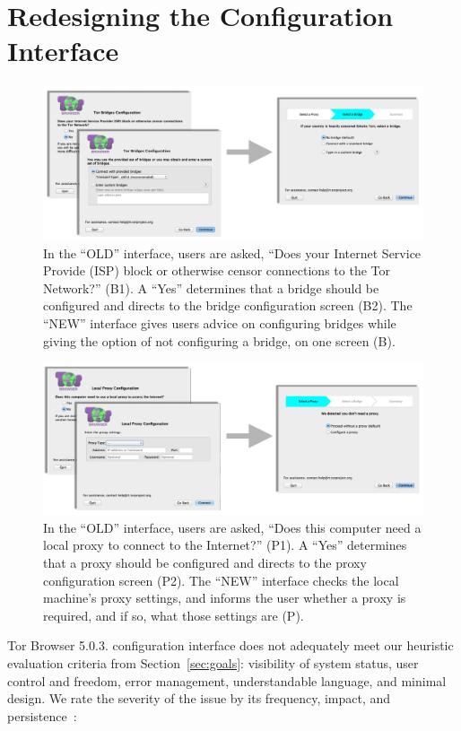 \documentclass[USenglish,oneside,twocolumn]{article}
\begin{document}
\section{Redesigning the Configuration Interface}
\label{redesign} 
 \begin{figure}[t]
	\centering
		\includegraphics[width=.8\textwidth]{bridge-screens.pdf} 
		\caption{In the ``OLD'' interface, users are asked, ``Does your Internet Service Provide (ISP) block or 
		otherwise censor connections to the Tor Network?'' (B1). A ``Yes'' determines that a bridge should 
		be configured and directs to the bridge configuration screen (B2). 
		The ``NEW'' interface gives users advice on configuring bridges
		while giving the option of not configuring a bridge, on one screen (B).} 
\end{figure} 

\begin{figure}[t]
	\centering
		\includegraphics[width=.8\textwidth]{proxy-screens.pdf} 
		\caption{In the ``OLD'' interface, users are asked, ``Does this computer need a local proxy to connect
		to the Internet?'' (P1). A ``Yes'' determines that a proxy should be configured and directs to the 
		proxy configuration screen (P2). The ``NEW'' interface checks the local machine's proxy settings,
		and informs the user whether a proxy is required, and if so, what those settings are (P).}
\end{figure}

Tor Browser 5.0.3. configuration interface does not adequately meet our heuristic evaluation criteria from Section~\ref{sec:goals}: visibility of system status, user control and freedom, error management, understandable language, and minimal design. We rate the severity of the issue by its frequency, impact, and persistence~\cite{nielsen1994heuristic}:\\
\end{document}
